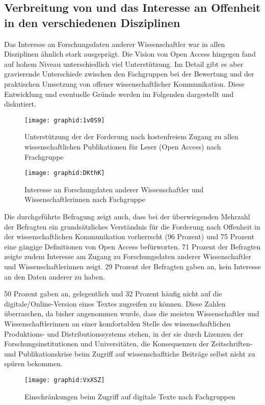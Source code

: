 \subsection{Verbreitung von und das Interesse an Offenheit in den verschiedenen Disziplinen}

Das Interesse an Forschungsdaten anderer Wissenschaftler war in allen Disziplinen ähnlich stark ausgeprägt. Die Vision von Open Access hingegen fand auf hohem Niveau unterschiedlich viel Unterstützung. Im Detail gibt es aber gravierende Unterschiede zwischen den Fachgruppen bei der Bewertung und der praktischen Umsetzung von offener wissenschaftlicher Kommunikation. Diese Entwicklung und eventuelle Gründe werden im Folgenden dargestellt und diskutiert.

\begin{figure}[h!]
\texttt{[image: graphid:1v0S9]}
\caption{Unterstützung der der Forderung nach kostenfreiem Zugang zu allen wissenschaftlichen Publikationen für Leser (Open Access) nach Frachgruppe}
\end{figure}

\begin{figure}[h!]
\texttt{[image: graphid:DKthK]}
\caption{Interesse an Forschungdaten anderer Wissenschaftler und Wissenschaftlerinnen nach Fachgruppe}
\end{figure}

Die durchgeführte Befragung zeigt auch, dass bei der überwiegenden Mehrzahl der Befragten ein grundsätzliches Verständnis für die Forderung nach Offenheit in der wissenschaftlichen Kommunikation vorherrscht (96 Prozent) und 75 Prozent eine gängige Definitionen von Open Access befürworten. 71 Prozent der Befragten zeigte zudem Interesse am Zugang zu Forschungsdaten anderer Wissenschaftler und Wissenschaftlerinnen zeigt. 29 Prozent der Befragten gaben an, kein Interesse an den Daten anderer zu haben.

50 Prozent gaben an, gelegentlich und 32 Prozent häufig nicht auf die digitale/Online-Version eines Textes zugreifen zu können. Diese Zahlen überraschen, da bisher angenommen wurde, dass die meisten Wissenschaftler und Wissenschaftlerinnen an einer komfortablen Stelle des wissenschaftlichen Produktions- und Distributionssystems \cite{herb_2010} stehen, in der sie durch Lizenzen der Forschungsinstitutionen und Universitäten, die Konsequenzen der Zeitschriften- und Publikationskrise beim Zugriff auf wissenschafltiche Beiträge selbst nicht zu spüren bekommen.

\begin{figure}[h!]
\texttt{[image: graphid:VxXSZ]}
\caption{Einschränkungen beim Zugriff auf digitale Texte nach Fachgruppen}
\end{figure}

